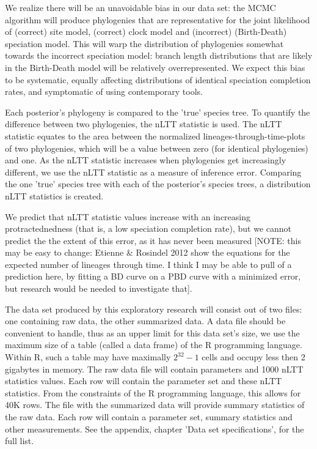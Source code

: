 \documentclass{article}
\begin{document}
We realize there will be an unavoidable bias in our data set: the MCMC
algorithm will produce phylogenies that are representative for the joint
likelihood of (correct) site model, (correct) clock model and 
(incorrect) (Birth-Death) speciation model. This will
warp the distribution of phylogenies somewhat towards the incorrect
speciation model: branch length distributions that are likely in the
Birth-Death model will be relatively overrepresented. We expect
this bias to be systematic, equally affecting distributions
of identical speciation completion rates, and symptomatic
of using contemporary tools.

Each posterior's phylogeny is compared to the 'true' species tree.
To quantify the difference between two phylogenies, the nLTT statistic
is used. The nLTT statistic equates to the area between the normalized
lineages-through-time-plots of two phylogenies, which will be a value between 
zero (for identical phylogenies) and one. As the nLTT statistic increases
when phylogenies get increasingly different, we use the nLTT statistic
as a measure of inference error. Comparing the one 'true' species tree
with each of the posterior's species trees, a distribution nLTT statistics
is created. 

We predict that nLTT statistic values increase 
with an increasing protractednedness (that is, a low speciation completion rate),
but we cannot predict the the extent of this error, as it has never been 
measured [NOTE: this may be easy to change: Etienne \& Rosindel 2012 show the equations
for the expected number of lineages through time. I think I may be able to pull
of a prediction here, by fitting a BD curve on a PBD curve with a minimized error,
but research would be needed to investigate that].

The data set produced by this exploratory research will consist out of two files:
one containing raw data, the other summarized data. 
A data file should be convenient to handle, thus as an upper limit for this data set's size, 
we use the maximum size of a table (called a data frame) of the R programming 
language. Within R, such a table may have maximally $2^{32}-1$ cells and occupy
less then 2 gigabytes in memory. 
The raw data file will contain parameters and 1000 nLTT statistics values.
Each row will contain the parameter set and these nLTT statistics.
From the constraints of the R programming language, this allows for 40K rows. 
The file with the summarized data will provide summary statistics of the raw
data. Each row will contain a parameter set, summary statistics and other
measurements. See the appendix, chapter 'Data set specifications', for the full list.
\end{document}

